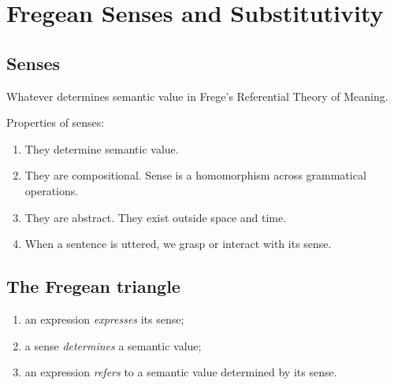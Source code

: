 \chapter{Fregean Senses and Substitutivity}

\section{Senses}

\begin{definition}
Whatever determines semantic value in Frege's Referential Theory of Meaning.
\end{definition}

Properties of senses:
\begin{enumerate}[label=\textbf{Property \arabic*:},leftmargin=*,align=left]
  \item They determine semantic value.
  \item They are compositional. Sense is a homomorphism across grammatical operations.
  \item They are abstract. They exist outside space and time.
  \item When a sentence is uttered, we grasp or interact with its sense.
\end{enumerate}

\section{The Fregean triangle}

\begin{minipage}{\linewidth}
\begin{center}
\end{center}

\begin{enumerate}
  \item an expression \emph{expresses} its sense;
  \item a sense \emph{determines} a semantic value;
  \item an expression \emph{refers} to a semantic value determined by its sense.
\end{enumerate}
\end{minipage}


